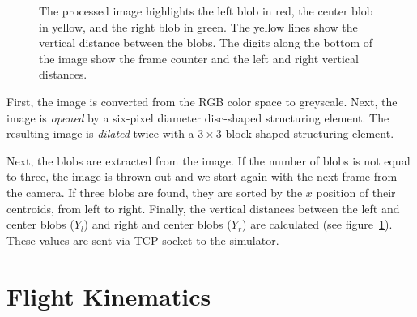 \documentclass{article}
\begin{document}
\begin{figure}[h!t]
\begin{center}
\end{center}
\caption{The processed image highlights the left blob in red, the center blob in yellow, and the right blob in green.  The yellow lines show the vertical distance between the blobs.  The digits along the bottom of the image show the frame counter and the left and right vertical distances.}
\label{fig:processed-image}
\end{figure}


First, the image is converted from the RGB color space to greyscale.  Next, the
image is \emph{opened} by a six-pixel diameter disc-shaped structuring element.
The resulting image is \emph{dilated} twice with a $3\times3$ block-shaped
structuring element.

Next, the blobs are extracted from the image.  If the number of blobs is not
equal to three, the image is thrown out and we start again with the next frame
from the camera.  If three blobs are found, they are sorted by the $x$ position
of their centroids, from left to right.  Finally, the vertical distances
between the left and center blobs ($Y_l$) and right and center blobs ($Y_r$)
are calculated (see figure~\ref{fig:processed-image}).  These values are sent
via TCP socket to the simulator. 

\section{Flight Kinematics}
\end{document}
